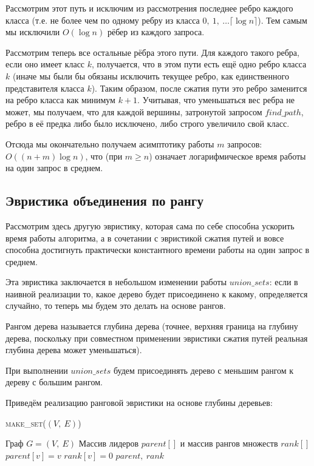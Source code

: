 \documentclass[a4paper,12pt]{article}
\newcommand{\algname}[1]{\textsc{#1}}
\begin{document}
Рассмотрим этот путь и исключим из рассмотрения последнее ребро каждого класса (т.е. не более чем по одному ребру из класса $0,\ 1,\ \ldots \lceil \log n \rceil$). Тем самым мы исключили $O(\log n)$ рёбер из каждого запроса.

Рассмотрим теперь все остальные рёбра этого пути. Для каждого такого ребра, если оно имеет класс $k$, получается, что в этом пути есть ещё одно ребро класса $k$ (иначе мы были бы обязаны исключить текущее ребро, как единственного представителя класса $k$). Таким образом, после сжатия пути это ребро заменится на ребро класса как минимум $k+1$. Учитывая, что уменьшаться вес ребра не может, мы получаем, что для каждой вершины, затронутой запросом $find\_path$, ребро в её предка либо было исключено, либо строго увеличило свой класс.

Отсюда мы окончательно получаем асимптотику работы $m$ запросов: $O((n+m) \log n)$, что (при $m \ge n$) означает логарифмическое время работы на один запрос в среднем.

\subsection{Эвристика объединения по рангу}

Рассмотрим здесь другую эвристику, которая сама по себе способна ускорить время работы алгоритма, а в сочетании с эвристикой сжатия путей и вовсе способна достигнуть практически константного времени работы на один запрос в среднем.

Эта эвристика заключается в небольшом изменении работы $union\_sets$: если в наивной реализации то, какое дерево будет присоединено к какому, определяется случайно, то теперь мы будем это делать на основе рангов.

Рангом дерева называется  глубина дерева (точнее, верхняя граница на глубину дерева, поскольку при совместном применении эвристики сжатия путей реальная глубина дерева может уменьшаться).

При выполнении $union\_sets$ будем присоединять дерево с меньшим рангом к дереву с большим рангом.

Приведём реализацию ранговой эвристики на основе глубины деревьев:

\begin{algorithm}
  	\caption{\algname{make\_set}($(V,\ E)$)}
	\begin{algorithmic}
	    \Require Граф $G = (V,\ E)$
	    \Ensure Массив лидеров $parent[]$ и массив рангов множеств $rank[]$
	    \State
	        \State $parent[v] = v$
	        \State $rank[v] = 0$
	   \EndFor
	   \Return $parent,\ rank$
	\end{algorithmic}
\end{algorithm}
\end{document}
